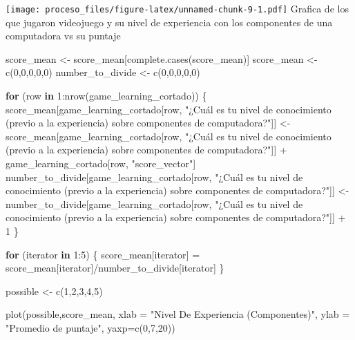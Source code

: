 \documentclass[
]{article}
\newenvironment{Shaded}{\begin{snugshade}}{\end{snugshade}}
\newcommand{\AttributeTok}[1]{\textcolor[rgb]{0.77,0.63,0.00}{#1}}
\newcommand{\ControlFlowTok}[1]{\textcolor[rgb]{0.13,0.29,0.53}{\textbf{#1}}}
\newcommand{\DecValTok}[1]{\textcolor[rgb]{0.00,0.00,0.81}{#1}}
\newcommand{\FunctionTok}[1]{\textcolor[rgb]{0.00,0.00,0.00}{#1}}
\newcommand{\NormalTok}[1]{#1}
\newcommand{\OtherTok}[1]{\textcolor[rgb]{0.56,0.35,0.01}{#1}}
\newcommand{\SpecialCharTok}[1]{\textcolor[rgb]{0.00,0.00,0.00}{#1}}
\newcommand{\StringTok}[1]{\textcolor[rgb]{0.31,0.60,0.02}{#1}}
\begin{document}
\texttt{[image: proceso\_files/figure-latex/unnamed-chunk-9-1.pdf]}
Grafica de los que jugaron videojuego y su nivel de experiencia con los
componentes de una computadora vs su puntaje

\begin{Shaded}
\begin{Highlighting}[]
\NormalTok{score\_mean }\OtherTok{\textless{}{-}}\NormalTok{ score\_mean[}\FunctionTok{complete.cases}\NormalTok{(score\_mean)]}
\NormalTok{score\_mean }\OtherTok{\textless{}{-}} \FunctionTok{c}\NormalTok{(}\DecValTok{0}\NormalTok{,}\DecValTok{0}\NormalTok{,}\DecValTok{0}\NormalTok{,}\DecValTok{0}\NormalTok{,}\DecValTok{0}\NormalTok{)}
\NormalTok{number\_to\_divide }\OtherTok{\textless{}{-}} \FunctionTok{c}\NormalTok{(}\DecValTok{0}\NormalTok{,}\DecValTok{0}\NormalTok{,}\DecValTok{0}\NormalTok{,}\DecValTok{0}\NormalTok{,}\DecValTok{0}\NormalTok{)}

\ControlFlowTok{for}\NormalTok{ (row }\ControlFlowTok{in} \DecValTok{1}\SpecialCharTok{:}\FunctionTok{nrow}\NormalTok{(game\_learning\_cortado))}
\NormalTok{\{}
\NormalTok{  score\_mean[game\_learning\_cortado[row, }\StringTok{"¿Cuál es tu nivel de conocimiento (previo a la experiencia) sobre componentes de computadora?"}\NormalTok{]] }\OtherTok{\textless{}{-}}\NormalTok{ score\_mean[game\_learning\_cortado[row, }\StringTok{"¿Cuál es tu nivel de conocimiento (previo a la experiencia) sobre componentes de computadora?"}\NormalTok{]] }\SpecialCharTok{+}\NormalTok{ game\_learning\_cortado[row, }\StringTok{"score\_vector"}\NormalTok{]}
\NormalTok{  number\_to\_divide[game\_learning\_cortado[row, }\StringTok{"¿Cuál es tu nivel de conocimiento (previo a la experiencia) sobre componentes de computadora?"}\NormalTok{]] }\OtherTok{\textless{}{-}}\NormalTok{ number\_to\_divide[game\_learning\_cortado[row, }\StringTok{"¿Cuál es tu nivel de conocimiento (previo a la experiencia) sobre componentes de computadora?"}\NormalTok{]] }\SpecialCharTok{+} \DecValTok{1}
\NormalTok{\}}

\ControlFlowTok{for}\NormalTok{ (iterator }\ControlFlowTok{in} \DecValTok{1}\SpecialCharTok{:}\DecValTok{5}\NormalTok{)}
\NormalTok{\{}
\NormalTok{  score\_mean[iterator] }\OtherTok{=}\NormalTok{ score\_mean[iterator]}\SpecialCharTok{/}\NormalTok{number\_to\_divide[iterator]}
\NormalTok{\}}

\NormalTok{possible }\OtherTok{\textless{}{-}} \FunctionTok{c}\NormalTok{(}\DecValTok{1}\NormalTok{,}\DecValTok{2}\NormalTok{,}\DecValTok{3}\NormalTok{,}\DecValTok{4}\NormalTok{,}\DecValTok{5}\NormalTok{)}

\FunctionTok{plot}\NormalTok{(possible,score\_mean, }\AttributeTok{xlab =} \StringTok{"Nivel De Experiencia (Componentes)"}\NormalTok{, }\AttributeTok{ylab =} \StringTok{"Promedio de puntaje"}\NormalTok{, }\AttributeTok{yaxp=}\FunctionTok{c}\NormalTok{(}\DecValTok{0}\NormalTok{,}\DecValTok{7}\NormalTok{,}\DecValTok{20}\NormalTok{))}
\end{Highlighting}
\end{Shaded}
\end{document}
